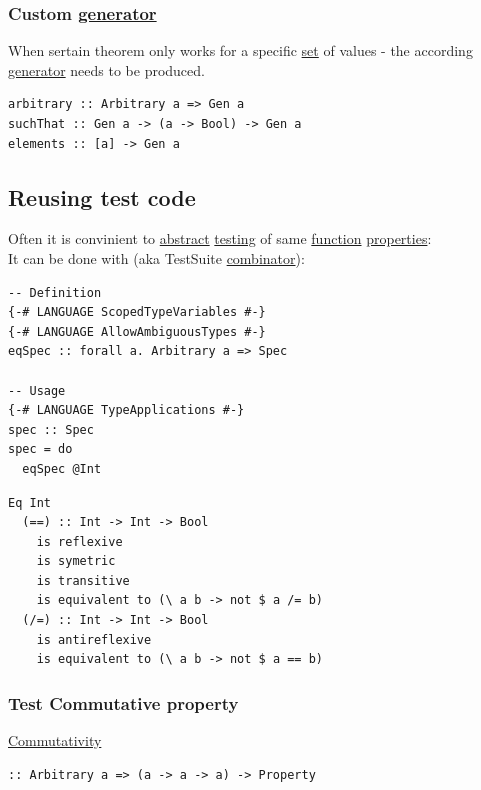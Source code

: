 \documentclass[a4paper,14pt,oneside]{book}
\begin{document}
\subsubsection{Custom \hyperref[orgd344dcd]{generator}}
\label{sec:org95127e0}
When sertain theorem only works for a specific \hyperref[org0f7f8fa]{set} of values - the according \hyperref[orgd344dcd]{generator} needs to be produced.\\

\begin{verbatim}
arbitrary :: Arbitrary a => Gen a
suchThat :: Gen a -> (a -> Bool) -> Gen a
elements :: [a] -> Gen a
\end{verbatim}

\subsection{\label{orgc1b34d7}Reusing test code}
\label{sec:org356acaf}
Often it is convinient to \hyperref[org9c8391a]{abstract} \hyperref[org9de3ef8]{testing} of same \hyperref[orge00b05b]{function} \hyperref[orgbcfea7d]{properties}:\\

It can be done with (aka TestSuite \hyperref[org020d205]{combinator}):\\
\begin{verbatim}
-- Definition
{-# LANGUAGE ScopedTypeVariables #-}
{-# LANGUAGE AllowAmbiguousTypes #-}
eqSpec :: forall a. Arbitrary a => Spec

-- Usage
{-# LANGUAGE TypeApplications #-}
spec :: Spec
spec = do
  eqSpec @Int
\end{verbatim}

\begin{verbatim}
Eq Int
  (==) :: Int -> Int -> Bool
    is reflexive
    is symetric
    is transitive
    is equivalent to (\ a b -> not $ a /= b)
  (/=) :: Int -> Int -> Bool
    is antireflexive
    is equivalent to (\ a b -> not $ a == b)
\end{verbatim}

\subsubsection{\label{orgd4afbf8}Test Commutative property}
\label{sec:org19b9285}
\hyperref[org976806d]{Commutativity}\\
\begin{verbatim}
:: Arbitrary a => (a -> a -> a) -> Property
\end{verbatim}
\end{document}
